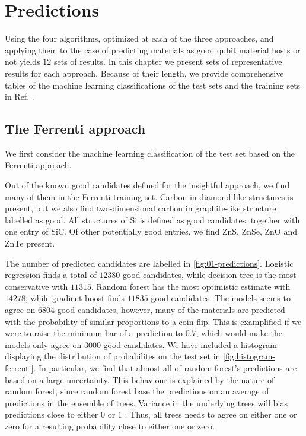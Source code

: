 \chapter{Predictions}

Using the four algorithms, optimized at each of the three approaches, and applying them to the case of predicting materials as good qubit material hosts or not yields $12$ sets of results. In this chapter we present sets of representative results for each approach. Because of their length, we provide comprehensive tables of the machine learning classifications of the test sets and the training sets in Ref. \cite{Ohebbi2021}.

\section{The Ferrenti approach}

We first consider the machine learning classification of the test set based on the Ferrenti approach.

Out of the known good candidates defined for the insightful approach, we find many of them in the Ferrenti training set. Carbon in diamond-like structures is present, but we also find two-dimensional carbon in graphite-like structure labelled as good. All structures of Si is defined as good candidates, together with one entry of SiC. Of other potentially good entries, we find ZnS, ZnSe, ZnO and ZnTe present.



The number of predicted candidates are labelled in \autoref{fig:01-predictions}. Logistic regression finds a total of $12380$ good candidates, while decision tree is the most conservative with $11315$. Random forest has the most optimistic estimate with $14278$, while gradient boost finds $11835$ good candidates. The models seems to agree on $6804$ good candidates, however, many of the materials are predicted with the probability of similar proportions to a coin-flip. This is examplified if we were to raise the minimum bar of a prediction to $0.7$, which would make the models only agree on $3000$ good candidates. We have included a histogram displaying the distribution of probabilites on the test set in \autoref{fig:histogram-ferrenti}. In particular, we find that almost all of random forest's predictions are based on a large uncertainty. This behaviour is explained by the nature of random forest, since random forest base the predictions on an average of predictions in the ensemble of trees. Variance in the underlying trees will bias predictions close to either $0$ or $1$ \cite{NiculescuMizil2005}. Thus, all trees needs to agree on either one or zero for a resulting probability close to either one or zero.

